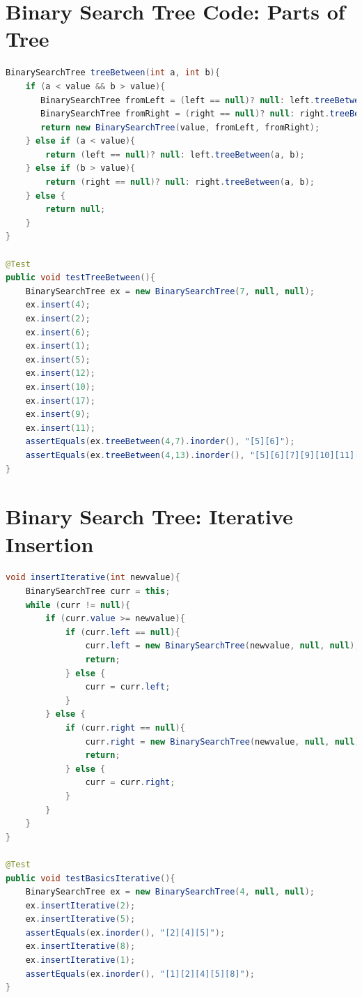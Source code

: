 \documentclass[twoside=false,DIV=14]{scrartcl}
\begin{document}
\section{Binary Search Tree Code: Parts of Tree}
{\small
\begin{lstlisting}[language=java]
  BinarySearchTree treeBetween(int a, int b){
    if (a < value && b > value){
       BinarySearchTree fromLeft = (left == null)? null: left.treeBetween(a,b);
       BinarySearchTree fromRight = (right == null)? null: right.treeBetween(a, b);
       return new BinarySearchTree(value, fromLeft, fromRight);
    } else if (a < value){
        return (left == null)? null: left.treeBetween(a, b);
    } else if (b > value){
        return (right == null)? null: right.treeBetween(a, b);
    } else {
        return null;
    }
}

@Test
public void testTreeBetween(){
    BinarySearchTree ex = new BinarySearchTree(7, null, null);
    ex.insert(4);
    ex.insert(2);
    ex.insert(6);
    ex.insert(1);
    ex.insert(5);
    ex.insert(12);
    ex.insert(10);
    ex.insert(17);
    ex.insert(9);
    ex.insert(11);
    assertEquals(ex.treeBetween(4,7).inorder(), "[5][6]");
    assertEquals(ex.treeBetween(4,13).inorder(), "[5][6][7][9][10][11][12]");
}
\end{lstlisting}
}
{\small
\section{Binary Search Tree: Iterative Insertion}
\begin{lstlisting}[language=java]
void insertIterative(int newvalue){
    BinarySearchTree curr = this;
    while (curr != null){
        if (curr.value >= newvalue){
            if (curr.left == null){
                curr.left = new BinarySearchTree(newvalue, null, null);
                return;
            } else {
                curr = curr.left;
            }
        } else {
            if (curr.right == null){
                curr.right = new BinarySearchTree(newvalue, null, null);
                return;
            } else {
                curr = curr.right;
            }
        }
    }
}

@Test
public void testBasicsIterative(){
    BinarySearchTree ex = new BinarySearchTree(4, null, null);
    ex.insertIterative(2);
    ex.insertIterative(5);
    assertEquals(ex.inorder(), "[2][4][5]");
    ex.insertIterative(8);
    ex.insertIterative(1);
    assertEquals(ex.inorder(), "[1][2][4][5][8]");
} 
\end{lstlisting}
}
\end{document}
